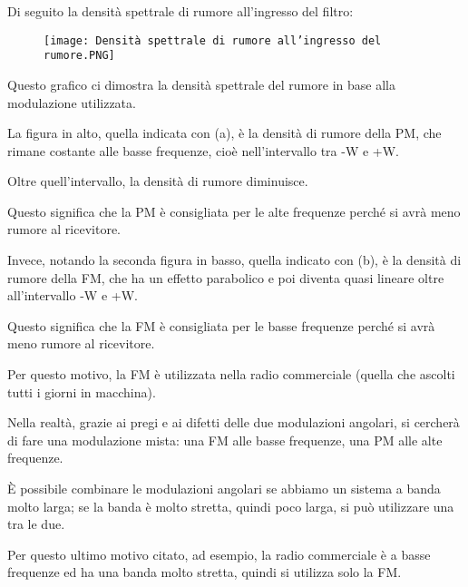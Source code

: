 \newpage 

Di seguito la densità spettrale di rumore all'ingresso del filtro: 

\begin{figure}[h]
    \centering
    \texttt{[image: Densità spettrale di rumore all'ingresso del rumore.PNG]}
\end{figure}

\begin{tcolorbox}
Questo grafico ci dimostra la densità spettrale del rumore in base alla modulazione utilizzata. \newline 

La figura in alto, quella indicata con (a), è la densità di rumore della PM, che rimane costante alle basse frequenze, cioè nell'intervallo tra -W e +W. \newline 

Oltre quell'intervallo, la densità di rumore diminuisce. \newline 

Questo significa che la PM è consigliata per le alte frequenze perché si avrà meno rumore al ricevitore. \newline 

Invece, notando la seconda figura in basso, quella indicato con (b), è la densità di rumore della FM, che ha un effetto parabolico e poi diventa quasi lineare oltre all'intervallo -W e +W. \newline 

Questo significa che la FM è consigliata per le basse frequenze perché si avrà meno rumore al ricevitore. \newline 

Per questo motivo, la FM è utilizzata nella radio commerciale (quella che ascolti tutti i giorni in macchina). \newline 

Nella realtà, grazie ai pregi e ai difetti delle due modulazioni angolari, si cercherà di fare una modulazione mista: una FM alle basse frequenze, una PM alle alte frequenze. \newline 

È possibile combinare le modulazioni angolari se abbiamo un sistema a banda molto larga; 
se la banda è molto stretta, quindi poco larga, si può utilizzare una tra le due. \newline 

Per questo ultimo motivo citato, ad esempio, la radio commerciale è a basse frequenze ed ha una banda molto stretta, quindi si utilizza solo la FM. 
\end{tcolorbox}

